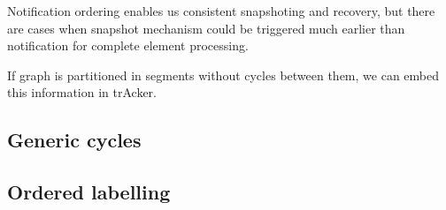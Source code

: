 Notification ordering enables us consistent snapshoting and recovery, but there are cases when snapshot mechanism could be triggered much earlier than notification for complete element processing.

If graph is partitioned in segments without cycles between them, we can embed this information in trAcker. 

\subsection{Generic cycles}

\subsection{Ordered labelling}







